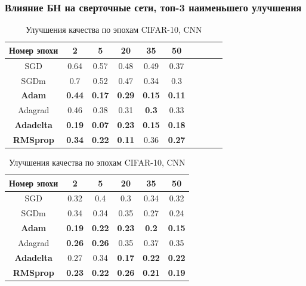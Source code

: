 \documentclass{beamer}
\begin{document}
\begin{frame}
	\frametitle{\small Влияние БН на сверточные сети, топ-3 наименьшего улучшения}
\begin{table}[h!]
\centering
\begin{minipage}{1\linewidth}
\centering
\scriptsize
\begin{tabular}{|c|c|c|c|c|c|c|c|c|c|}\hline
\textbf{Номер эпохи} & \textbf{2} & \textbf{5}  & \textbf{20}  & \textbf{35} & \textbf{50} \\\hline

SGD & 0.64 & 0.57  & 0.48  & 0.49 & 0.37 \\\hline

SGDm & 0.7 & 0.52  & 0.47  & 0.34 & 0.3 \\\hline

\textbf{Adam} & \textbf{0.44} & \textbf{0.17}  & \textbf{0.29}  & \textbf{0.15} & \textbf{0.11} \\\hline

Adagrad & 0.46 & 0.38  & 0.31 & \textbf{0.3} & 0.33 \\\hline

\textbf{Adadelta} & \textbf{0.19} & \textbf{0.07}  & \textbf{0.23} & \textbf{0.15} & \textbf{0.18} \\\hline

\textbf{RMSprop} & \textbf{0.34} & \textbf{0.22}  & \textbf{0.11}  & 0.36 & \textbf{0.27} \\\hline
\end{tabular}
\caption{\scriptsize Улучшения качества по эпохам MNIST, CNN} 
\end{minipage} \vfill
\begin{minipage}{1\linewidth}
\centering
\scriptsize
\begin{tabular}{|c|c|c|c|c|c|}\hline
\textbf{Номер эпохи} & \textbf{2} & \textbf{5} & \textbf{20} & \textbf{35} & \textbf{50} \\\hline
SGD & 0.32 & 0.4 & 0.3 & 0.34 & 0.32 \\\hline

SGDm & 0.34 & 0.34 & 0.35 & 0.27 & 0.24 \\\hline

\textbf{Adam} & \textbf{0.19} & \textbf{0.22} & \textbf{0.23} &\textbf{ 0.2} & \textbf{0.15} \\\hline

Adagrad & \textbf{0.26} & \textbf{0.26} & 0.35 & 0.37 & 0.35 \\\hline

\textbf{Adadelta} & 0.27 & 0.34 & \textbf{0.17} & \textbf{0.22} & \textbf{0.22} \\\hline

\textbf{RMSprop} & \textbf{0.23} & \textbf{0.22} & \textbf{0.26} & \textbf{0.21} & \textbf{0.19} \\\hline

\end{tabular}
\caption{\scriptsize Улучшения качества по эпохам CIFAR-10, CNN}
\end{minipage}
\end{table}
\end{frame}
\end{document}
